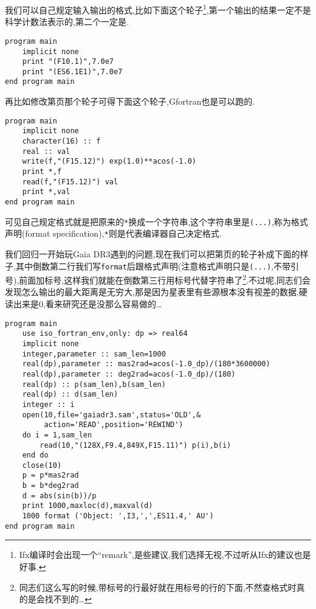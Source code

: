 我们可以自己规定输入输出的格式,比如下面这个轮子\footnote{Ifx编译时会出现一个``remark'',是些建议,我们选择无视,不过听从Ifx的建议也是好事.},第一个输出的结果一定不是科学计数法表示的,第二个一定是.
\begin{lstlisting}
program main
    implicit none
    print "(F10.1)",7.0e7
    print "(ES6.1E1)",7.0e7
end program main
\end{lstlisting}
再比如修改第\pageref{internal_file}页那个轮子可得下面这个轮子,Gfortran也是可以跑的.
\begin{lstlisting}
program main
    implicit none
    character(16) :: f
    real :: val
    write(f,"(F15.12)") exp(1.0)**acos(-1.0)
    print *,f
    read(f,"(F15.12)") val
    print *,val
end program main
\end{lstlisting}
可见自己规定格式就是把原来的\texttt{*}换成一个字符串,这个字符串里是\texttt{(...)},称为格式声明(format specification),\texttt{*}则是代表编译器自己决定格式.

我们回归一开始玩Gaia DR3遇到的问题,现在我们可以把第\pageref{gaiadr3.sam}页的轮子补成下面的样子,其中倒数第二行我们写\texttt{format}后跟格式声明(注意格式声明只是\texttt{(...)},不带引号),前面加标号,这样我们就能在倒数第三行用标号代替字符串了\footnote{同志们这么写的时候,带标号的行最好就在用标号的行的下面,不然查格式时真的是会找不到的\dots}.不过呢,同志们会发现怎么输出的最大距离是无穷大,那是因为星表里有些源根本没有视差的数据,硬读出来是$0$,看来研究还是没那么容易做的\dots
\begin{lstlisting}
program main
    use iso_fortran_env,only: dp => real64
    implicit none
    integer,parameter :: sam_len=1000
    real(dp),parameter :: mas2rad=acos(-1.0_dp)/(180*3600000)
    real(dp),parameter :: deg2rad=acos(-1.0_dp)/(180)
    real(dp) :: p(sam_len),b(sam_len)
    real(dp) :: d(sam_len)
    integer :: i
    open(10,file='gaiadr3.sam',status='OLD',&
         action='READ',position='REWIND')
    do i = 1,sam_len
        read(10,"(128X,F9.4,849X,F15.11)") p(i),b(i)
    end do
    close(10)
    p = p*mas2rad
    b = b*deg2rad
    d = abs(sin(b))/p
    print 1000,maxloc(d),maxval(d)
    1000 format ('Object: ',I3,',',ES11.4,' AU')
end program main
\end{lstlisting}

